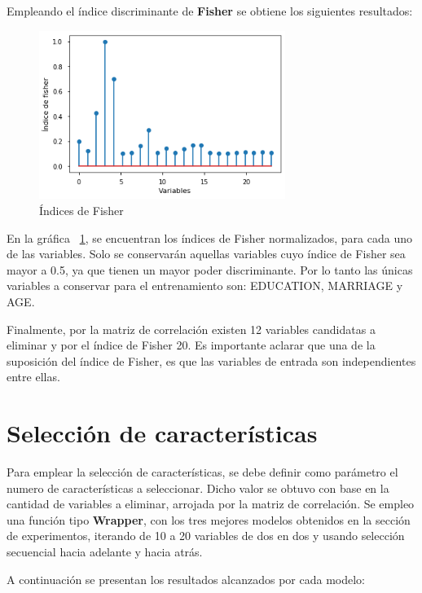 \documentclass[conference]{IEEEtran}
\begin{document}
Empleando el índice discriminante de \textbf{Fisher} se obtiene los siguientes resultados:
\begin{center}
    \begin{figure}[H]
        \hfill
     \centerline{\includegraphics[width=8cm]{fisher.png}}
    \caption{Índices de Fisher}
    \label{fig:indexFisher}
    \end{figure}  
\end{center}
En la gráfica ~\ref{fig:indexFisher}, se encuentran los índices de Fisher normalizados, para cada uno de las variables. Solo se conservarán aquellas variables cuyo índice de Fisher sea mayor a 0.5, ya que tienen un mayor poder discriminante. Por lo tanto las únicas variables a conservar para el entrenamiento son: EDUCATION, MARRIAGE y AGE.

Finalmente, por la matriz de correlación existen 12 variables candidatas a eliminar y por el índice de Fisher 20. Es importante aclarar que una de la suposición del índice de Fisher, es que las variables de entrada son independientes entre ellas.

\section{Selección de características}
Para emplear la selección de características, se debe definir como parámetro el numero de características a seleccionar. Dicho valor se obtuvo con base en la cantidad de variables a eliminar, arrojada por la matriz de correlación. Se empleo una función tipo \textbf{Wrapper}, con los tres mejores modelos obtenidos en la sección de experimentos, iterando de 10 a 20 variables de dos en dos y usando selección secuencial hacia adelante y hacia atrás.

A continuación se presentan los resultados alcanzados por cada modelo:
\end{document}
